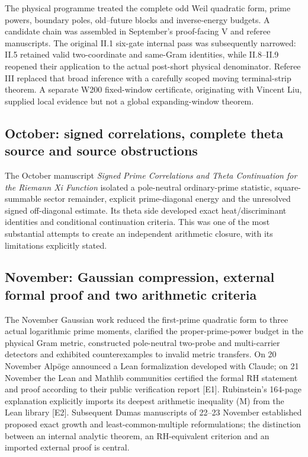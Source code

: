 \documentclass[
  10pt,
  a4paper,
  10pt,
  oneside,
  openany]{book}
\begin{document}
The physical programme treated the complete odd Weil quadratic form,
prime powers, boundary poles, old--future blocks and inverse-energy
budgets. A candidate chain was assembled in September's proof-facing V
and referee manuscripts. The original II.1 six-gate internal pass was
subsequently narrowed: II.5 retained valid two-coordinate and same-Gram
identities, while II.8--II.9 reopened their application to the actual
post-short physical denominator. Referee III replaced that broad
inference with a carefully scoped moving terminal-strip theorem. A
separate W200 fixed-window certificate, originating with Vincent Liu,
supplied local evidence but not a global expanding-window theorem.

\subsection{October: signed correlations, complete theta source and
source
obstructions}\label{october-signed-correlations-complete-theta-source-and-source-obstructions}

The October manuscript \emph{Signed Prime Correlations and Theta
Continuation for the Riemann Xi Function} isolated a pole-neutral
ordinary-prime statistic, square-summable sector remainder, explicit
prime-diagonal energy and the unresolved signed off-diagonal estimate.
Its theta side developed exact heat/discriminant identities and
conditional continuation criteria. This was one of the most substantial
attempts to create an independent arithmetic closure, with its
limitations explicitly stated.

\subsection{November: Gaussian compression, external formal proof and
two arithmetic
criteria}\label{november-gaussian-compression-external-formal-proof-and-two-arithmetic-criteria}

The November Gaussian work reduced the first-prime quadratic form to
three actual logarithmic prime moments, clarified the proper-prime-power
budget in the physical Gram metric, constructed pole-neutral two-probe
and multi-carrier detectors and exhibited counterexamples to invalid
metric transfers. On 20 November Alpöge announced a Lean formalization
developed with Claude; on 21 November the Lean and Mathlib communities
certified the formal RH statement and proof according to their public
verification report {[}E1{]}. Rubinstein's 164-page explanation
explicitly imports its deepest arithmetic inequality (M) from the Lean
library {[}E2{]}. Subsequent Dumas manuscripts of 22--23 November
established proposed exact growth and least-common-multiple
reformulations; the distinction between an internal analytic theorem, an
RH-equivalent criterion and an imported external proof is central.
\end{document}
